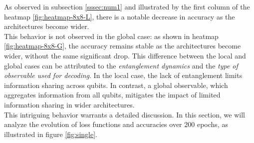 

As observed in subsection \ref{sssec:num1} and illustrated by the first column of the heatmap 
\ref{fig:heatmap-8x8-L}, there is a notable decrease in accuracy as the architectures become wider.\\
This behavior is not observed in the global case: as shown in heatmap \ref{fig:heatmap-8x8-G}, 
the accuracy remains stable as the architectures become wider, without the same significant drop.
This difference between the local and global cases can be attributed to the \textit{entanglement dynamics} and 
the \textit{type of observable used for decoding}. 
In the local case, the lack of entanglement limits information sharing across qubits. 
In contrast, a global observable, which aggregates information from all qubits, mitigates the 
impact of limited information sharing in wider architectures.\\

This intriguing behavior warrants a detailed discussion. 
In this section, we will analyze the evolution of loss functions and accuracies over 200 epochs, 
as illustrated in figure \ref{fig:single}.

